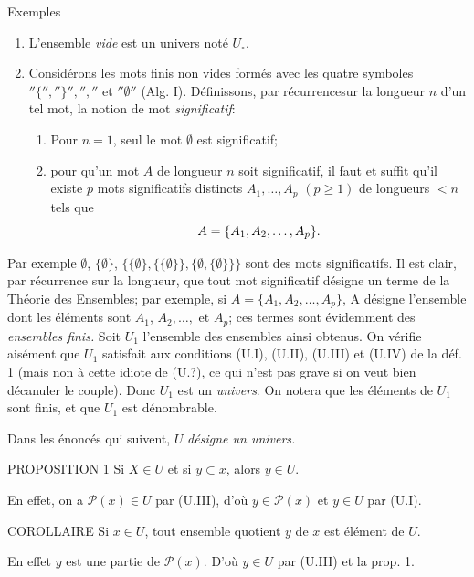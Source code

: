 \documentclass[10pt]{../fichiers-configuration-latex/smfart}
\def\labelenumi{(\theenumi)}
\def\labelenumii{(\theenumii)}
\begin{document}
\begin{enonce*}[remark]{Exemples}
\begin{enumerate}
\renewcommand{\labelenumi}{\theenumi)}
\item L'ensemble \emph{vide} est un univers noté $U_\circ$.

\item Considérons les mots finis non vides formés avec les quatre
symboles $''\{'',''\}'','',''$ et $''∅''$ (\cf Alg. I).
Définissons, par récurrence\pageoriginale sur la longueur $n$ d'un
tel mot, la notion de mot \emph{significatif}:
\begin{enumerate}
\renewcommand{\theenumii}{\alph{enumii}}
\renewcommand{\labelenumii}{(\theenumii)}
\item Pour $n=1$, seul le mot $∅$ est significatif;

\item pour qu'un mot $A$ de longueur $n$ soit significatif, il faut et
suffit qu'il existe $p$ mots significatifs distincts
$A_1,\ldots,A_p$ $(p\geq 1)$ de longueurs $<n$ tels que
$$
A=\{A_1,A_2,\dots,A_p\}{}.
$$
\end{enumerate}
\end{enumerate}
\end{enonce*}
\noindent Par exemple $∅$, $\{∅\}$,
$\{\{∅\},\{\{∅\}\},\{∅,\{∅\}\}\}$
sont des mots significatifs. Il est clair, par récurrence sur la
longueur, que tout mot significatif désigne un terme de la Théorie
des Ensembles; par exemple, si $A=\{A_1,A_2,\ldots,A_p\}$, A
désigne l'ensemble dont les éléments sont $A_1$, $A_2,\ldots,$ et
$A_p$; ces termes sont évidemment des \emph{ensembles finis.} Soit
$U_1$ l'ensemble des ensembles ainsi obtenus. On vérifie aisément
que $U_1$ satisfait aux conditions (U.I), (U.II), (U.III) et (U.IV)
de la déf. 1 (mais non à cette idiote de (U.?), ce qui n'est pas
grave si on veut bien décanuler le couple). Donc $U_1$ est un
\emph{univers}. On notera que les éléments de $U_1$ sont finis, et
que $U_1$ est dénombrable.

Dans les énoncés qui suivent, $U$ \emph{désigne un univers.}

\begin{enonce*}{PROPOSITION 1}
Si $X\in U$ et si $y\subset x$, alors $y\in U$.
\end{enonce*}
En effet, on a $\mathcal{P}(x)\in U$ par (U.III), d'où $y\in
\mathcal{P}(x)$ et $y\in U$ par (U.I).

\begin{enonce*}{COROLLAIRE}
Si $x\in U$, tout ensemble quotient $y$ de $x$ est élément de $U$.
\end{enonce*}
En effet $y$ est une partie de $\mathcal{P}(x)$. D'où $y\in U$ par
(U.III) et la prop. 1.
\end{document}
